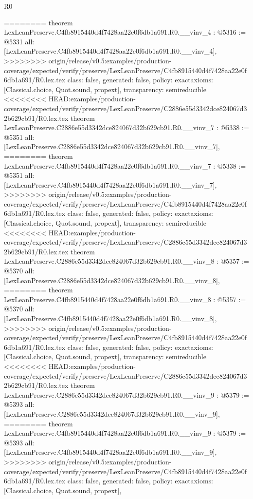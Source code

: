 \begin{lexlean}{R0}
\begin{coremodule}
{{{{{{{{{{{{{{{{{{{{{{{{{{{{{{{{{{{{{{{{{{{{{{{{{{{{{{{{{{{{{{{{{{{{{{{{{{========
theorem LexLeanPreserve.C4fb8915440d4f7428aa22e0f6db1a691.R0.__vinv_4 : @5316 := @5331 {
  all: [LexLeanPreserve.C4fb8915440d4f7428aa22e0f6db1a691.R0.__vinv_4],
>>>>>>>> origin/release/v0.5:examples/production-coverage/expected/verify/preserve/LexLeanPreserve/C4fb8915440d4f7428aa22e0f6db1a691/R0.lex.tex
  class: false,
  generated: false,
  policy: exact{axioms: [Classical.choice, Quot.sound, propext]},
  transparency: semireducible
}
<<<<<<<< HEAD:examples/production-coverage/expected/verify/preserve/LexLeanPreserve/C2886e55d3342dce824067d32b629cb91/R0.lex.tex
theorem LexLeanPreserve.C2886e55d3342dce824067d32b629cb91.R0.__vinv_7 : @5338 := @5351 {
  all: [LexLeanPreserve.C2886e55d3342dce824067d32b629cb91.R0.__vinv_7],
========
theorem LexLeanPreserve.C4fb8915440d4f7428aa22e0f6db1a691.R0.__vinv_7 : @5338 := @5351 {
  all: [LexLeanPreserve.C4fb8915440d4f7428aa22e0f6db1a691.R0.__vinv_7],
>>>>>>>> origin/release/v0.5:examples/production-coverage/expected/verify/preserve/LexLeanPreserve/C4fb8915440d4f7428aa22e0f6db1a691/R0.lex.tex
  class: false,
  generated: false,
  policy: exact{axioms: [Classical.choice, Quot.sound, propext]},
  transparency: semireducible
}
<<<<<<<< HEAD:examples/production-coverage/expected/verify/preserve/LexLeanPreserve/C2886e55d3342dce824067d32b629cb91/R0.lex.tex
theorem LexLeanPreserve.C2886e55d3342dce824067d32b629cb91.R0.__vinv_8 : @5357 := @5370 {
  all: [LexLeanPreserve.C2886e55d3342dce824067d32b629cb91.R0.__vinv_8],
========
theorem LexLeanPreserve.C4fb8915440d4f7428aa22e0f6db1a691.R0.__vinv_8 : @5357 := @5370 {
  all: [LexLeanPreserve.C4fb8915440d4f7428aa22e0f6db1a691.R0.__vinv_8],
>>>>>>>> origin/release/v0.5:examples/production-coverage/expected/verify/preserve/LexLeanPreserve/C4fb8915440d4f7428aa22e0f6db1a691/R0.lex.tex
  class: false,
  generated: false,
  policy: exact{axioms: [Classical.choice, Quot.sound, propext]},
  transparency: semireducible
}
<<<<<<<< HEAD:examples/production-coverage/expected/verify/preserve/LexLeanPreserve/C2886e55d3342dce824067d32b629cb91/R0.lex.tex
theorem LexLeanPreserve.C2886e55d3342dce824067d32b629cb91.R0.__vinv_9 : @5379 := @5393 {
  all: [LexLeanPreserve.C2886e55d3342dce824067d32b629cb91.R0.__vinv_9],
========
theorem LexLeanPreserve.C4fb8915440d4f7428aa22e0f6db1a691.R0.__vinv_9 : @5379 := @5393 {
  all: [LexLeanPreserve.C4fb8915440d4f7428aa22e0f6db1a691.R0.__vinv_9],
>>>>>>>> origin/release/v0.5:examples/production-coverage/expected/verify/preserve/LexLeanPreserve/C4fb8915440d4f7428aa22e0f6db1a691/R0.lex.tex
  class: false,
  generated: false,
  policy: exact{axioms: [Classical.choice, Quot.sound, propext]},
}}}}}}}}}}}}}}}}}}}}}}}}}}}}}}}}}}}}}}}}}}}}}}}}}}}}}}}}}}}}}}}}}}}}}}}}}}}}}}
\end{coremodule}
\end{lexlean}
